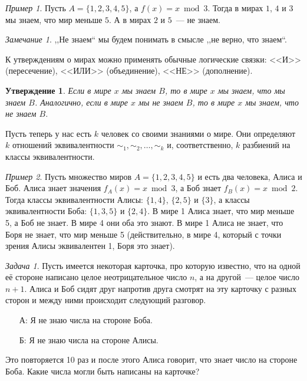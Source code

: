 \documentclass[12pt]{article}
\theoremstyle{definition}
\theoremstyle{plain}
\newtheorem{statement}{Утверждение}[section]
\theoremstyle{remark}
\newtheorem{example}{Пример}[section]
\newtheorem{remark}{Замечание}[section]
\newtheorem{problem}{Задача}[section]
\begin{document}
\begin{example}
    Пусть $A = \{1,2,3,4,5\}$, а $f(x) = x \bmod 3$. Тогда в мирах $1$, $4$ и $3$ мы знаем, 
    что мир меньше $5$.  А в мирах $2$ и $5$~--- не знаем.
\end{example}
\begin{remark}
    ,,Не знаем`` мы будем понимать в смысле ,,не верно, что знаем``.
\end{remark}

К утверждениям о мирах можно применять обычные логические связки: <<И>> (пересечение), <<ИЛИ>> (объединение),
<<НЕ>> (дополнение).

\begin{statement}
    Если в мире $x$ мы знаем $B$, то в мире $x$ мы знаем, что мы знаем $B$.
    Аналогично, если в мире $x$ мы не знаем $B$, то в мире $x$ мы знаем, что не знаем $B$.
\end{statement}

Пусть теперь у нас есть $k$ человек со своими знаниями о мире. 
Они определяют $k$ отношений эквивалентности $\sim_1,\sim_2,\dotsc,\sim_k$ и,
соответственно, $k$ разбиений на классы эквивалентности.

\begin{example}
    Пусть множество миров $A = \{1,2,3,4,5\}$ и есть два человека, Алиса и Боб.
    Алиса знает значения $f_A(x) = x \bmod 3$, а Боб знает $f_B(x) = x\bmod 2$.
    Тогда классы эквивалентности Алисы: $\{1,4\}$, $\{2,5\}$ и $\{3\}$,
    а классы эквивалентности Боба:  $\{1,3,5\}$ и $\{2,4\}$.
    В мире 1 Алиса знает, что мир меньше 5, а Боб не знает. В мире 4 они оба это знают.
    В мире 1 Алиса не знает, что Боря не знает, что мир меньше 5 (действительно, в мире 4,
    который с точки зрения Алисы эквивалентен 1, Боря это знает).
\end{example}

\begin{problem}
    Пусть имеется некоторая карточка, про которую известно, 
    что на одной её стороне написано целое неотрицательное
    число $n$, а на другой~--- целое число $n+1$.
    Алиса и Боб сидят друг напротив друга смотрят на эту карточку с разных сторон и между ними происходит
    следующий разговор.
    \begin{itemize}
        \item[А:] Я не знаю числа на стороне Боба.
        \item[Б:] Я не знаю числа на стороне Алисы.
    \end{itemize}
    Это повторяется 10 раз и после этого Алиса говорит, что знает число на стороне Боба. Какие числа могли быть написаны
    на карточке?
\end{problem}
\end{document}
